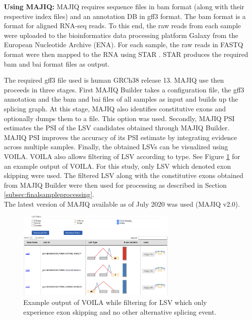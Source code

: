 \textbf{Using MAJIQ:} MAJIQ requires sequence files in bam format (along with their respective index files) and an annotation DB in gff3 format. The bam format is a format for aligned RNA-seq reads. 
To this end, the raw reads from each sample were uploaded to the bioinformatics data processing platform Galaxy \cite{galaxy} from the European Nucleotide Archive (ENA). For each sample, the raw reads in FASTQ format were then mapped to the RNA using STAR \cite{star}. STAR produces the required bam and bai format files as output.

The required gff3 file used is human GRCh38 release 13.
MAJIQ use then proceeds in three stages. First MAJIQ Builder takes a configuration file, the gff3 annotation and the bam and bai files of all samples as input and builds up the splicing graph. At this stage, MAJIQ also identifies constitutive exons and optionally dumps them to a file. This option was used.
Secondly, MAJIQ PSI estimates the PSI of the LSV candidates obtained through MAJIQ Builder. MAJIQ PSI improves the accuracy of its PSI estimate by integrating evidence across multiple samples.
Finally, the obtained LSVs can be visualized using VOILA. VOILA also allows filtering of LSV according to type. See Figure \ref{fig:voilaexample} for an example output of VOILA. For this study, only LSV which denoted exon skipping were used. The filtered LSV along with the constitutive exons obtained from MAJIQ Builder were then used for processing as described in Section \ref{subsec:finalsampleprocessing}.\\
The latest version of MAJIQ available as of July 2020 was used (MAJIQ v2.0).


\begin{figure}
	\centering\includegraphics[width=0.7\textwidth]{../visualizations/ch4-methods/voila_example.png} 
	\caption[Four-chamber illustration of the human heart.]{Example output of VOILA while filtering for LSV which only experience exon skipping and no other alternative splicing event. }
	\label{fig:voilaexample}
\end{figure}


